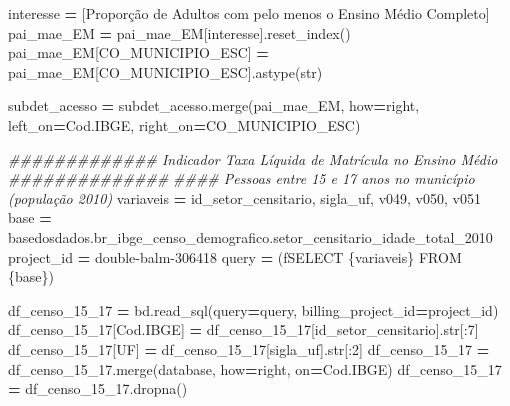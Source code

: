 \documentclass[
  12,
  dvipsnames]{article}
\newenvironment{Shaded}{\begin{snugshade}}{\end{snugshade}}
\newcommand{\BuiltInTok}[1]{#1}
\newcommand{\CommentTok}[1]{\textcolor[rgb]{0.56,0.35,0.01}{\textit{#1}}}
\newcommand{\DecValTok}[1]{\textcolor[rgb]{0.00,0.00,0.81}{#1}}
\newcommand{\NormalTok}[1]{#1}
\newcommand{\OperatorTok}[1]{\textcolor[rgb]{0.81,0.36,0.00}{\textbf{#1}}}
\newcommand{\SpecialCharTok}[1]{\textcolor[rgb]{0.00,0.00,0.00}{#1}}
\newcommand{\SpecialStringTok}[1]{\textcolor[rgb]{0.31,0.60,0.02}{#1}}
\newcommand{\StringTok}[1]{\textcolor[rgb]{0.31,0.60,0.02}{#1}}
\begin{document}
\begin{Shaded}
\begin{Highlighting}[]
\NormalTok{interesse }\OperatorTok{=}\NormalTok{ [}\StringTok{\textquotesingle{}Proporção de Adultos com pelo menos o Ensino Médio Completo\textquotesingle{}}\NormalTok{]}
\NormalTok{pai\_mae\_EM }\OperatorTok{=}\NormalTok{ pai\_mae\_EM[interesse].reset\_index()}
\NormalTok{pai\_mae\_EM[}\StringTok{\textquotesingle{}CO\_MUNICIPIO\_ESC\textquotesingle{}}\NormalTok{] }\OperatorTok{=}\NormalTok{ pai\_mae\_EM[}\StringTok{\textquotesingle{}CO\_MUNICIPIO\_ESC\textquotesingle{}}\NormalTok{].astype(}\BuiltInTok{str}\NormalTok{)}

\NormalTok{subdet\_acesso }\OperatorTok{=}\NormalTok{ subdet\_acesso.merge(pai\_mae\_EM, how}\OperatorTok{=}\StringTok{\textquotesingle{}right\textquotesingle{}}\NormalTok{, left\_on}\OperatorTok{=}\StringTok{\textquotesingle{}Cod.IBGE\textquotesingle{}}\NormalTok{,}
\NormalTok{                                    right\_on}\OperatorTok{=}\StringTok{\textquotesingle{}CO\_MUNICIPIO\_ESC\textquotesingle{}}\NormalTok{)}

\CommentTok{\#\#\#\#\#\#\#\#\#\#\#\#\# Indicador Taxa Líquida de Matrícula no Ensino Médio \#\#\#\#\#\#\#\#\#\#\#\#\#\#}
\CommentTok{\#\#\#\# Pessoas entre 15 e 17 anos no município (população 2010)}
\NormalTok{variaveis }\OperatorTok{=} \StringTok{\textquotesingle{}id\_setor\_censitario, sigla\_uf, v049, v050, v051\textquotesingle{}}
\NormalTok{base }\OperatorTok{=} \StringTok{\textquotesingle{}\textasciigrave{}basedosdados.br\_ibge\_censo\_demografico.setor\_censitario\_idade\_total\_2010\textasciigrave{}\textquotesingle{}}
\NormalTok{project\_id }\OperatorTok{=} \StringTok{\textquotesingle{}double{-}balm{-}306418\textquotesingle{}}
\NormalTok{query }\OperatorTok{=}\NormalTok{ (}\SpecialStringTok{f\textquotesingle{}SELECT }\SpecialCharTok{\{}\NormalTok{variaveis}\SpecialCharTok{\}}\SpecialStringTok{ FROM }\SpecialCharTok{\{}\NormalTok{base}\SpecialCharTok{\}}\SpecialStringTok{\textquotesingle{}}\NormalTok{)}

\NormalTok{df\_censo\_15\_17 }\OperatorTok{=}\NormalTok{ bd.read\_sql(query}\OperatorTok{=}\NormalTok{query, billing\_project\_id}\OperatorTok{=}\NormalTok{project\_id)}
\NormalTok{df\_censo\_15\_17[}\StringTok{\textquotesingle{}Cod.IBGE\textquotesingle{}}\NormalTok{] }\OperatorTok{=}\NormalTok{ df\_censo\_15\_17[}\StringTok{\textquotesingle{}id\_setor\_censitario\textquotesingle{}}\NormalTok{].}\BuiltInTok{str}\NormalTok{[:}\DecValTok{7}\NormalTok{]}
\NormalTok{df\_censo\_15\_17[}\StringTok{\textquotesingle{}UF\textquotesingle{}}\NormalTok{] }\OperatorTok{=}\NormalTok{ df\_censo\_15\_17[}\StringTok{\textquotesingle{}sigla\_uf\textquotesingle{}}\NormalTok{].}\BuiltInTok{str}\NormalTok{[:}\DecValTok{2}\NormalTok{]}
\NormalTok{df\_censo\_15\_17 }\OperatorTok{=}\NormalTok{ df\_censo\_15\_17.merge(database, how}\OperatorTok{=}\StringTok{\textquotesingle{}right\textquotesingle{}}\NormalTok{, on}\OperatorTok{=}\StringTok{\textquotesingle{}Cod.IBGE\textquotesingle{}}\NormalTok{)}
\NormalTok{df\_censo\_15\_17 }\OperatorTok{=}\NormalTok{ df\_censo\_15\_17.dropna()}


\end{Highlighting}
\end{Shaded}
\end{document}
